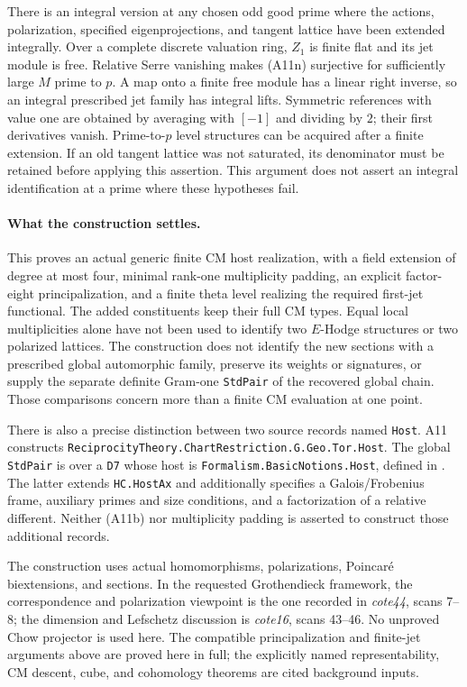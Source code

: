 \documentclass[11pt]{article}
\theoremstyle{definition}\newtheorem{definition}[theorem]{Definition}\newtheorem{remark}[theorem]{Remark}
\begin{document}
There is an integral version at any chosen odd good prime
where the actions, polarization, specified eigenprojections,
and tangent lattice have been extended integrally.  Over a
complete discrete valuation ring, $Z_1$ is finite flat and its
jet module is free.  Relative Serre vanishing makes (A11n)
surjective for sufficiently large $M$ prime to $p$.  A map
onto a finite free module has a linear right inverse, so an
integral prescribed jet family has integral lifts.  Symmetric
references with value one are obtained by averaging with
$[-1]$ and dividing by $2$; their first derivatives vanish.
Prime-to-$p$ level structures can be acquired after a finite
extension.  If an old tangent lattice was not saturated, its
denominator must be retained before applying this assertion.
This argument does not assert an integral identification at a
prime where these hypotheses fail.

\paragraph{What the construction settles.}
This proves an actual generic finite CM host realization,
with a field extension of degree at most four, minimal
rank-one multiplicity padding, an explicit factor-eight
principalization, and a finite theta level realizing the
required first-jet functional.  The added constituents keep
their full CM types.  Equal local multiplicities alone have
not been used to identify two $E$-Hodge structures or two
polarized lattices.  The construction does not identify the
new sections with a prescribed global automorphic family,
preserve its weights or signatures, or supply the separate
definite Gram-one \texttt{StdPair} of the recovered global
chain.  Those comparisons concern more than a finite CM
evaluation at one point.

There is also a precise distinction between two source records
named \texttt{Host}.  A11 constructs
\nolinkurl{ReciprocityTheory.ChartRestriction.G.Geo.Tor.Host}.
The global \texttt{StdPair} is over a \texttt{D7} whose host is
\nolinkurl{Formalism.BasicNotions.Host}, defined in
.
The latter extends \texttt{HC.HostAx} and additionally
specifies a Galois/Frobenius frame, auxiliary primes and
size conditions, and a factorization of a relative different.
Neither (A11b) nor multiplicity padding is asserted to
construct those additional records.

The construction uses actual homomorphisms, polarizations,
Poincar\'e biextensions, and sections.  In the requested
Grothendieck framework, the correspondence and polarization
viewpoint is the one recorded in \emph{cote44}, scans 7--8;
the dimension and Lefschetz discussion is \emph{cote16}, scans
43--46.  No unproved Chow projector is used here.  The
compatible principalization and finite-jet arguments above
are proved here in full; the explicitly named representability, CM descent,
cube, and cohomology theorems are cited background inputs.
\end{document}
